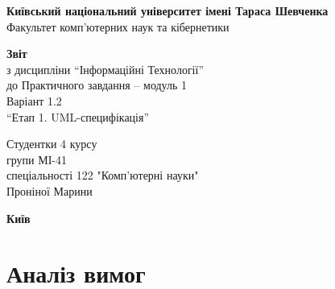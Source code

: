 \documentclass[12pt,a4paper]{article}
\begin{document}
\begin{titlepage}
\centering\large
\textbf{Київський національний університет імені Тараса Шевченка}\\
Факультет комп'ютерних наук та кібернетики

\textbf{Звіт}\\
з дисципліни “Інформаційні Технології”\\
до Практичного завдання -- модуль 1\\
Варіант 1.2\\
“Етап 1. UML-специфікація”

\begin{flushright}
Студентки 4 курсу\\
групи МІ-41\\
спеціальності 122 "Комп’ютерні науки"\\
Проніної Марини
\end{flushright}

\textbf{Київ \the\year}
\end{titlepage}

\begin{abstract}
\noindent
У документі наведено комплект UML-діаграм для проєкту \textbf{«Хмарне сховище»} --- програмної системи типу 2 (клієнт віддаленої файлової папки, спрощений аналог Google Drive) за варіантом \textbf{12}: перегляд вмісту файлів \texttt{.xml} (як текст) і \texttt{.png} (як зображення), сортування за датою модифікації за зростанням/спаданням та фільтрація «усі файли / .java / .png». Система складається з сервера на Python (FastAPI + SQLite), десктоп-клієнта (PySide6/Qt) та веб-клієнта (Vue 3). Діаграми описують систему такою, якою її реально реалізовано, і впорядковані за життєвим циклом проєктування: від аналізу вимог до деталізованого проєктування підсистем. Усі діаграми побудовано в нотації Mermaid; вихідні тексти --- у \texttt{docs/\allowbreak{}diagrams-uml/\allowbreak{}src/\allowbreak{}}, зображення --- у \texttt{docs/\allowbreak{}diagrams-uml/\allowbreak{}img/\allowbreak{}}.
\end{abstract}

\tableofcontents
\newpage


\section{Аналіз вимог}
\end{document}
